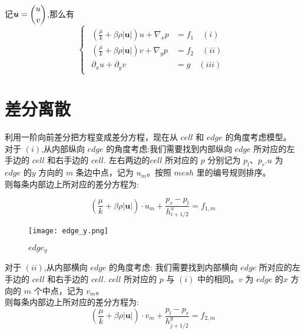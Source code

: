 \documentclass[leqno]{article}
\begin{document}
记$\boldsymbol{u} = \dbinom{u}{v}$,那么有\\

\begin{equation*}
\begin{cases}
\begin{aligned}
(\frac{\mu}{k} + \beta\rho|\boldsymbol{u}|)u + \nabla_x p & = f_1 \quad (i) \\
(\frac{\mu}{k} + \beta\rho|\boldsymbol{u}|)v + \nabla_y p & = f_2 \quad (ii) \\
\partial_x u + \partial_y v & = g \quad (iii)
\end{aligned}
\end{cases}
\end{equation*}

\section{差分离散}

利用一阶向前差分把方程变成差分方程，现在从 $cell$ 和 $edge$ 的角度考虑模型。\\
对于 $(i)$,从内部纵向 $edge$ 的角度考虑:我们需要找到内部纵向 $edge$ 所对应的左手边的 $cell$ 和右手边的 $cell$. 左右两边的$cell$ 所对应的 $p$ 分别记为 $p_{l}$、$p_{r}$.$u$ 为 $edge$ 的$y$ 方向的 $m$ 条边中点，记为 $u_m$。按照 $mesh$ 里的编号规则排序。\\

则每条内部边上所对应的差分方程为:

\begin{equation}\label{eq:um}
(\frac{\mu}{k} + \beta\rho\left|\boldsymbol{u}\right|) \cdot u_m + \frac{p_r - p_l}{h^x_{i+1/2}} = f_{1,m}
\end{equation}

\begin{figure}[H] 
\centering 
\texttt{[image: edge\_y.png]} 
\caption{$edge_y$} 
\label{fig:label} 
\end{figure}

对于 $(ii)$,从内部横向 $edge$ 的角度考虑:
我们需要找到内部横向 $edge$ 所对应的左手边的 $cell$ 和右手边的 $cell$. $cell$ 所对应的 $p$ 与 $(i)$ 中的相同。$v$ 为 $edge$ 的$x$ 方向的 $m$ 个中点，记为 $v_m$。\\

则每条内部边上所对应的差分方程为:\\

\begin{equation}\label{eq:vm}
(\frac{\mu}{k} + \beta\rho\left|\boldsymbol{u}\right|) \cdot v_m + \frac{p_l - p_r}{h^y_{j+1/2}} = f_{2,m}
\end{equation}
\end{document}
